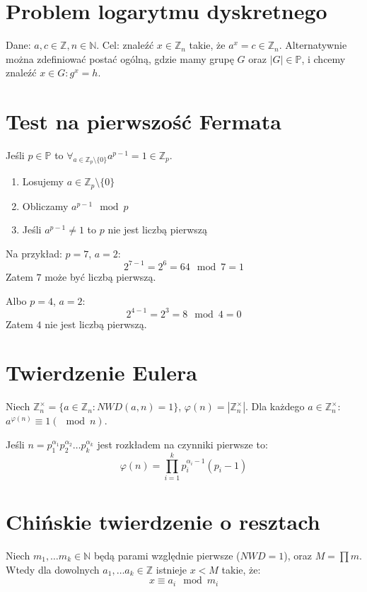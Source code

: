 \documentclass{../notatki}
\begin{document}
\section{Problem logarytmu dyskretnego}

Dane: $a, c \in \mathbb{Z}, n \in \mathbb{N}$. Cel: znaleźć $x \in
\mathbb{Z}_n$ takie, że $a^x = c \in \mathbb{Z}_n$. Alternatywnie można
zdefiniować postać ogólną, gdzie mamy grupę $G$ oraz $|G| \in \mathbb{P}$,
i chcemy znaleźć $x \in G : g^x = h$.

\section{Test na pierwszość Fermata}

Jeśli $p \in \mathbb{P}$ to $\forall_{a \in \mathbb{Z}_p \setminus
\{0\}} a^{p - 1} = 1 \in \mathbb{Z}_p$.

\begin{enumerate}
  \item Losujemy $a \in \mathbb{Z}_p \setminus \{0\}$
  \item Obliczamy $a^{p - 1} \mod p$
  \item Jeśli $a^{p - 1} \ne 1$ to $p$ nie jest liczbą pierwszą
\end{enumerate}

\noindent
Na przykład: $p = 7$, $a = 2$:
$$
2^{7 - 1} = 2^6 = 64 \mod 7 = 1
$$
Zatem $7$ może być liczbą pierwszą.

\noindent
Albo $p = 4$, $a = 2$:
$$
2^{4 - 1} = 2^3 = 8 \mod 4 = 0
$$
Zatem $4$ nie jest liczbą pierwszą.

\section{Twierdzenie Eulera}

Niech $\mathbb{Z}_n^\times = \{a \in \mathbb{Z}_n : NWD(a,n) = 1\}$,
$\varphi(n) = |\mathbb{Z}_n^\times|$. Dla każdego $a \in \mathbb{Z}_n^\times$:
$a^{\varphi(n)} \equiv 1 (\mod n)$.

Jeśli $n = p_1^{\alpha_1}p_2^{\alpha_2} \dots p_k^{\alpha_k}$ jest rozkładem
na czynniki pierwsze to:
$$
\varphi(n) = \prod_{i = 1}^k p_i^{\alpha_i - 1}(p_i - 1)
$$

\section{Chińskie twierdzenie o resztach}

Niech $m_1, \dots m_k \in \mathbb{N}$ będą parami względnie pierwsze
($NWD = 1$), oraz $M = \prod m$. Wtedy dla dowolnych $a_1, \dots a_k
\in \mathbb{Z}$ istnieje $x < M$ takie, że:
$$
x \equiv a_i \mod m_i
$$
\end{document}
